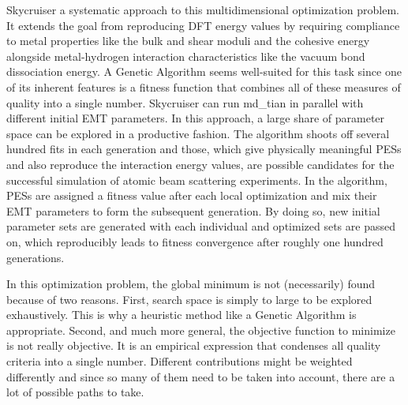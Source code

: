 \documentclass[twoside, 11pt, titlepage, captions=nooneline, a4paper, headsepline]{scrbook}%
\newcommand{\9}{\mathrm}
\newcommand{\0}{\,\mathrm}
\begin{document}
Skycruiser a systematic approach to this multidimensional optimization problem. It extends the goal from reproducing DFT energy values by requiring compliance to metal properties like the bulk and shear moduli and the cohesive energy alongside metal-hydrogen interaction characteristics like the vacuum bond dissociation energy. A Genetic Algorithm seems well-suited for this task since one of its inherent features is a fitness function that combines all of these measures of quality into a single number. Skycruiser can run md\_tian in parallel with different initial EMT parameters. In this approach, a large share of parameter space can be explored in a productive fashion. The algorithm shoots off several hundred fits in each generation and those, which give physically meaningful PESs and also reproduce the interaction energy values, are possible candidates for the successful simulation of atomic beam scattering experiments. In the algorithm, PESs are assigned a fitness value after each local optimization and mix their EMT parameters to form the subsequent generation. By doing so, new initial parameter sets are generated with each individual and optimized sets are passed on, which reproducibly leads to fitness convergence after roughly one hundred generations.

In this optimization problem, the global minimum is not (necessarily) found because of two reasons. First, search space is simply to large to be explored exhaustively. This is why a heuristic method like a Genetic Algorithm is appropriate. Second, and much more general, the objective function to minimize is not really objective. It is an empirical expression that condenses all quality criteria into a single number. Different contributions might be weighted differently and since so many of them need to be taken into account, there are a lot of possible paths to take.
\end{document}
